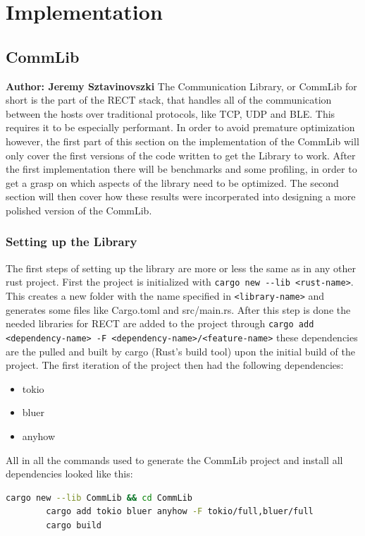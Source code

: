 \chapter{Implementation}

\section{CommLib}
\textbf{Author: Jeremy Sztavinovszki} 
The Communication Library, or CommLib for short is the part of the RECT stack, that handles all of the communication between the hosts over traditional protocols, like TCP, UDP and BLE.
This requires it to be especially performant. In order to avoid premature optimization however, the first part of this section on the implementation of the CommLib will only cover the first versions
of the code written to get the Library to work. After the first implementation there will be benchmarks and some profiling, in order to get a grasp on which aspects of the library need to be
optimized. The second section will then cover how these results were incorperated into designing a more polished version of the CommLib.

\subsection{Setting up the Library} 
The first steps of setting up the library are more or less the same as in any other rust project. First the project is initialized with \verb+cargo new --lib <rust-name>+. This creates a
new folder with the name specified in \verb+<library-name>+ and generates some files like Cargo.toml and src/main.rs. After this step is done the needed libraries for RECT are added to the
project through \verb+cargo add <dependency-name> -F <dependency-name>/<feature-name>+ these dependencies are the pulled and built by cargo (Rust's build tool) upon the initial build of the
project. The first iteration of the project then had the following dependencies:

\begin{itemize}
	\item tokio
	\item bluer
	\item anyhow
\end{itemize}

All in all the commands used to generate the CommLib project and install all dependencies looked like this:
\newline
\begin{minipage}{\textwidth}
	\begin{lstlisting}[language=bash, caption=Setup Commands for CommLib]
		cargo new --lib CommLib && cd CommLib
		cargo add tokio bluer anyhow -F tokio/full,bluer/full
		cargo build
	\end{lstlisting}
\end{minipage}

